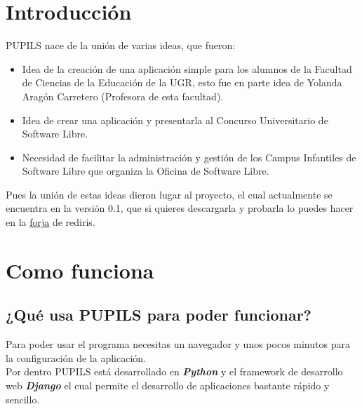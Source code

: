 \documentclass[a4paper,12pt]{article}
\begin{document}
	\tableofcontents
	\newpage

	\section{Introducción} \label{introduccion}
		PUPILS nace de la unión de varias ideas, que fueron:
		\\
		\begin{itemize}
			\item Idea de la creación de una aplicación simple para los alumnos de la Facultad de Ciencias de la Educación de la UGR, esto fue 
				en parte idea de Yolanda Aragón Carretero (Profesora de esta facultad).
			\item Idea de crear una aplicación y presentarla al Concurso Universitario de Software Libre.
			\item Necesidad de facilitar la administración y gestión de los Campus Infantiles de Software Libre que organiza la 
				Oficina de Software Libre.
		\end{itemize}
		Pues la unión de estas ideas dieron lugar al proyecto, el cual actualmente se encuentra en la versión 0.1, que si quieres descargarla y 
		probarla lo puedes hacer en la {\href{https://forja.rediris.es/projects/cusl6-pupils/}{forja}} de rediris.
	\newpage
	
	\section{Como funciona} \label{como_funciona}
		\subsection{¿Qué usa PUPILS para poder funcionar?}
		Para poder usar el programa necesitas un navegador y unos pocos minutos para la configuración de la aplicación.
		\\
		Por dentro PUPILS está desarrollado en \textbf{\emph{Python}} y el framework de desarrollo web \textbf{\emph{Django}} el cual permite el 
		desarrollo de aplicaciones bastante rápido y sencillo.
		
\end{document}
